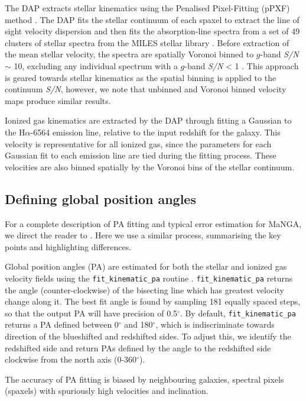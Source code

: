 \documentclass[fleqn,usenatbib]{mnras}
\begin{document}
The DAP extracts stellar kinematics using the Penalised Pixel-Fitting (pPXF) method \citep{cappellari2004,cappellari2017}. The DAP fits the stellar continuum of each spaxel to extract the line of sight velocity dispersion and then fits the absorption-line spectra from a set of 49 clusters of stellar spectra from the MILES stellar library \citep{sanchez2006,falcon2011}. Before extraction of the mean stellar velocity, the spectra are spatially Voronoi binned to $g$-band \textit{S/N} $\sim$ 10, excluding any individual spectrum with a $g$-band \textit{S/N} < 1 \citep{cappellari2003}. This approach is geared towards stellar kinematics as the spatial binning is applied to the continuum \textit{S/N}, however, we note that unbinned and Voronoi binned velocity maps produce similar results. 

Ionized gas kinematics are extracted by the DAP through fitting a Gaussian to the H$\alpha$-6564 emission line, relative to the input redshift for the galaxy. This velocity is representative for all ionized gas, since the parameters for each Gaussian fit to each emission line are tied during the fitting process. These velocities are also binned spatially by the Voronoi bins of the stellar continuum. 

\subsection{Defining global position angles}
For a complete description of PA fitting and typical error estimation for MaNGA, we direct the reader to \citet{duckworth2019}. Here we use a similar process, summarising the key points and highlighting differences.

Global position angles (PA) are estimated for both the stellar and ionized gas velocity fields using the \texttt{fit\_kinematic\_pa} routine \citep[see Appendix C of][for a description of the process]{krajnovic2006}. \texttt{fit\_kinematic\_pa} returns the angle (counter-clockwise) of the bisecting line which has greatest velocity change along it. The best fit angle is found by sampling 181 equally spaced steps, so that the output PA will have precision of 0.5$^{\circ}$. By default, \texttt{fit\_kinematic\_pa} returns a PA defined between 0$^{\circ}$ and 180$^{\circ}$, which is indiscriminate towards direction of the blueshifted and redshifted sides. To adjust this, we identify the redshifted side and return PAs defined by the angle to the redshifted side clockwise from the north axis (0-360$^{\circ}$). 

The accuracy of PA fitting is biased by neighbouring galaxies, spectral pixels (spaxels) with spuriously high velocities and inclination. 
\end{document}
